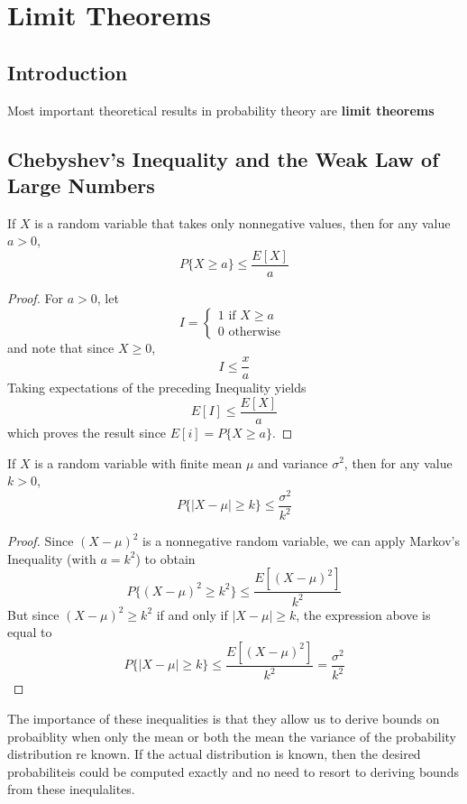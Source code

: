 \setcounter{chapter}{7}
\chapter{Limit Theorems}
\section{Introduction}
Most important theoretical results in probability theory are \textbf{limit theorems}
\section{Chebyshev's Inequality and the Weak Law of Large Numbers}
\begin{definition}
    If $X$ is a random variable that takes only nonnegative values, then for any value $a > 0$, \[P\{X\geq a\}\leq \frac{E[X]}{a}\]
\end{definition}
\begin{proof}For $a > 0$, let 
    \begin{equation*}
        I =
        \begin{cases}
            1 \text{ if } X\geq a   \\
            0 \text{ otherwise }
        \end{cases}
    \end{equation*} and note that since $X\geq 0$, \[I\leq\frac{x}{a}\] Taking expectations of the preceding Inequality yields \[E[I]\leq\frac{E[X]}{a}\] which proves the result since $E[i] = P\{X\geq a\}$. 
\end{proof}
\begin{definition}
    If $X$ is a random variable with finite mean $\mu$ and variance $\sigma^2$, then for any value $k > 0$, \[P\{|X - \mu|\geq k\}\leq \frac{\sigma^2}{k^2}\]
\end{definition}
\begin{proof}
    Since $(X - \mu)^2$ is a nonnegative random variable, we can apply Markov's Inequality (with $a = k^2$) to obtain \[P\{(X - \mu)^2\geq k^2\}\leq \frac{E[(X - \mu)^2]}{k^2}\] But since $(X - \mu)^2\geq k^2$ if and only if $| X - \mu |\geq k$, the expression above is equal to \[P\{|X-\mu|\geq k\}\leq \frac{E[(X - \mu)^2]}{k^2} = \frac{\sigma^2}{k^2}\]
\end{proof}
The importance of these inequalities is that they allow us to derive bounds on probaiblity when only the mean or both the mean the variance of the probability distribution re known. If the actual distribution is known, then the desired probabiliteis could be computed exactly and no need to resort to deriving bounds from these inequlalites. 

